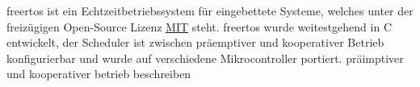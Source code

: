 \documentclass[../EDF Master Thesis.tex]{subfiles}
\begin{document}
    \ac{freertos} ist ein Echtzeitbetriebssystem für eingebettete Systeme, welches unter der freizügigen Open-Source Lizenz \href{https://de.wikipedia.org/wiki/MIT-Lizenz}{MIT} steht.
    \ac{freertos} wurde weitestgehend in C entwickelt, der Scheduler ist zwischen präemptiver und kooperativer Betrieb konfigurierbar und wurde auf verschiedene Mikrocontroller portiert.
    präimptiver und kooperativer betrieb beschreiben
\end{document}
